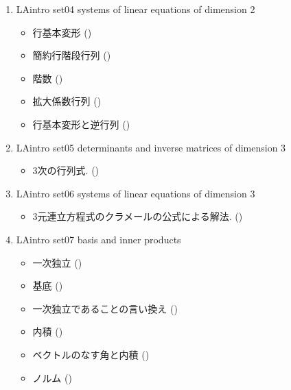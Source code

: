 \begin{enumerate}
\begin{itemize}
  \item 逆行列 ()
  \item 行列式と三角形の面積 ()
  \item 逆行列を用いた連立方程式の解法 ()
  \item 逆行列と正則行列 ()
  \item 行列式が積を保存すること ()
  \end{itemize}
\item
  LAintro set04 systems of linear equations of dimension 2
  \begin{itemize}
  \item 行基本変形 ()
  \item 簡約行階段行列 ()
  \item 階数 ()
  \item 拡大係数行列 ()
  \item 行基本変形と逆行列 ()
  \end{itemize}
\item\label{item:webwork:3d-1}
  LAintro set05 determinants and inverse matrices of dimension 3
  \begin{itemize}
  \item 3次の行列式. ()
  \end{itemize}
\item\label{item:webwork:3d-2}
  LAintro set06 systems of linear equations of dimension 3
  \begin{itemize}
  \item 3元連立方程式のクラメールの公式による解法. ()
  \end{itemize}  
\item
  LAintro set07 basis and inner products
  \begin{itemize}
  \item 一次独立 ()
  \item 基底 ()
  \item 一次独立であることの言い換え ()
  \item 内積 ()
  \item ベクトルのなす角と内積 ()
  \item ノルム ()

\end{itemize}
\end{enumerate}
